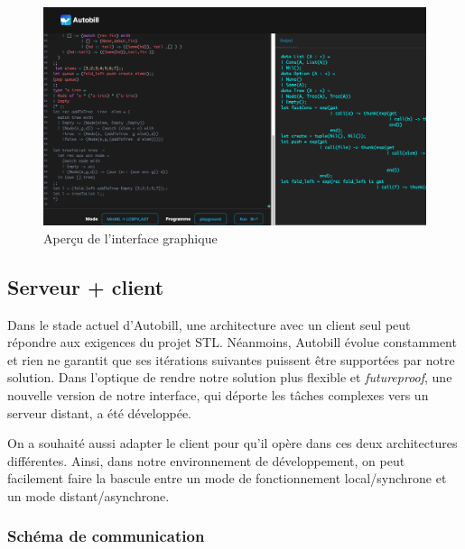 \documentclass[
  12pt,
]{article}
\begin{document}
\begin{figure}
  \centering
  \includegraphics{Figures/screen.png}
  \caption{Aperçu de l'interface graphique}
\end{figure}

\newpage

\hypertarget{serveur-client}{%
  \subsection{Serveur + client}\label{serveur-client}}

Dans le stade actuel d'Autobill, une architecture avec un client seul
peut répondre aux exigences du projet STL. Néanmoins, Autobill évolue
constamment et rien ne garantit que ses itérations suivantes puissent
être supportées par notre solution. Dans l'optique de rendre notre
solution plus flexible et \emph{futureproof}, une nouvelle version de
notre interface, qui déporte les tâches complexes vers un serveur
distant, a été développée.

On a souhaité aussi adapter le client pour qu'il opère dans ces deux
architectures différentes. Ainsi, dans notre environnement de
développement, on peut facilement faire la bascule entre un mode de
fonctionnement local/synchrone et un mode distant/asynchrone.

\hypertarget{schuxe9ma-de-communication}{%
  \subsubsection{Schéma de
    communication}\label{schuxe9ma-de-communication}}
\end{document}
